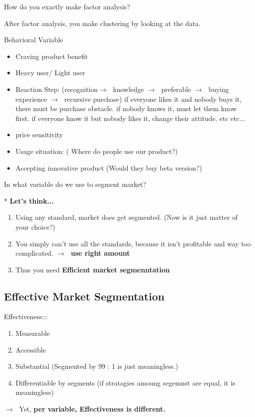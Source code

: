 \documentclass[12pt]{article}
\newcommand{\ra}{$\rightarrow \text{ }$}
\begin{document}
\begin{tcolorbox}
	How do you exactly make factor analysis?
\end{tcolorbox}

After factor analysis, you make clustering by looking at the data.


Behavioral Variable

\begin{itemize}
	\item Craving product benefit
	\item Heavy user/ Light user
	\item Reaction Step: (recognition\ra knowledge \ra preferable \ra buying experience \ra recursive purchase)
	if everyone likes it and nobody buys it, there must be purchase obstacle.
	if nobody knows it, must let them know first.
	if everyone know it but nobody likes it, change their attitude.
	etc etc...
	\item price sensitivity
	\item Usage situation: ( Where do people use our product?)
	\item Accepting innovative product (Would they buy beta version?)

\end{itemize}

{\large In what variable do we use to segment market?}

* \textbf{Let's think...}
\begin{enumerate}
	\item Using any standard, market does get segmented. (Now is it just matter of your choice?)
	\item You simply can't use all the standards, because it isn't profitable and way too complicated. \ra \textbf{use right amount}
	\item Thus you need \textbf{Efficient market segmenntation}
\end{enumerate}

\subsection{Effective Market Segmentation}
{\large Effectiveness:::
\begin{enumerate}
	\item Measurable %
	\item Accessible
	\item Substantial (Segmented by 99 : 1 is just meaningless.)
	\item Differentiable by segments (if stratagies amoung segemnst are equal, it is meaningless)
\end{enumerate}
}
\ra Yet, \textbf{per variable, Effectiveness is different.} %
\end{document}
